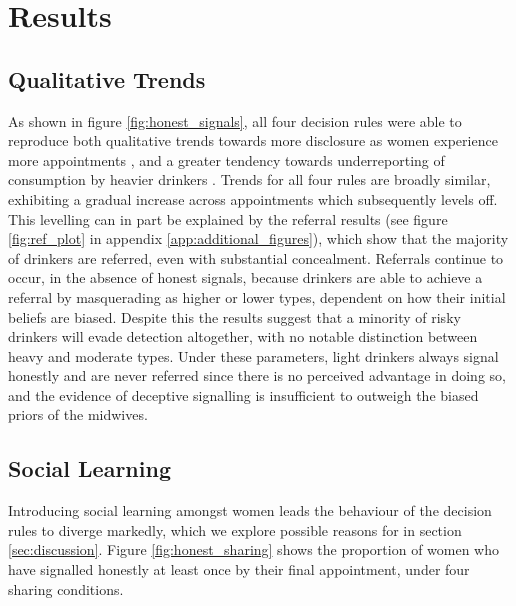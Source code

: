 \section{Results}
\label{sec:results}


\subsection{Qualitative Trends}
\label{sub:qt_results}

As shown in figure \ref{fig:honest_signals}, all four decision rules were able to reproduce both qualitative trends towards more disclosure as women experience more appointments \citep{Phillips2007}, and a greater tendency towards underreporting of consumption by heavier drinkers \citep{Alvik2006}.  Trends for all four rules are broadly similar, exhibiting a gradual increase across appointments which subsequently levels off. This levelling can in part be explained by the referral results (see figure \ref{fig:ref_plot} in appendix \ref{app:additional_figures}), which show that the majority of drinkers are referred, even with substantial concealment. Referrals continue to occur, in the absence of honest signals, because drinkers are able to achieve a referral by masquerading as higher or lower types, dependent on how their initial beliefs are biased. Despite this the results suggest that a minority of risky drinkers will evade detection altogether, with no notable distinction between heavy and moderate types. Under these parameters, light drinkers always signal honestly and are never referred since there is no perceived advantage in doing so, and the evidence of deceptive signalling is insufficient to outweigh the biased priors of the midwives. 

\subsection{Social Learning}
\label{sub:sharing_results}

Introducing social learning amongst women leads the behaviour of the decision rules to diverge markedly, which we explore possible reasons for in section \ref{sec:discussion}. Figure \ref{fig:honest_sharing} shows the proportion of women who have signalled honestly at least once by their final appointment, under four sharing conditions. 

